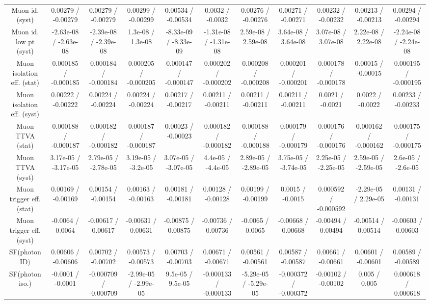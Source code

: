 \begin{table}[htbp]
\begin{center}
\begin{tabular}{|c|c|c|c|c|c|c|c|c|c|c|}
  Muon id. (syst) & 0.00279 / -0.00279 & 0.00279 / -0.00279 & 0.00299 / -0.00299 & 0.00534 / -0.00534 & 0.0032 / -0.0032 & 0.00276 / -0.00276 & 0.00271 / -0.00271 & 0.00232 / -0.00232 & 0.00213 / -0.00213 & 0.00294 / -0.00294 \\ 
  Muon id. low pt (syst) & -2.63e-08 / -2.63e-08 & -2.39e-08 / -2.39e-08 & 1.3e-08 / 1.3e-08 & -8.33e-09 / -8.33e-09 & -1.31e-08 / -1.31e-08 & 2.59e-08 / 2.59e-08 & 3.64e-08 / 3.64e-08 & 3.07e-08 / 3.07e-08 & 2.22e-08 / 2.22e-08 & -2.24e-08 / -2.24e-08 \\ 
  Muon isolation eff. (stat) & 0.000185 / -0.000185 & 0.000184 / -0.000184 & 0.000205 / -0.000205 & 0.000147 / -0.000147 & 0.000202 / -0.000202 & 0.000208 / -0.000208 & 0.000201 / -0.000201 & 0.000178 / -0.000178 & 0.00015 / -0.00015 & 0.000195 / -0.000195 \\ 
  Muon isolation eff. (syst) & 0.00222 / -0.00222 & 0.00224 / -0.00224 & 0.00224 / -0.00224 & 0.00217 / -0.00217 & 0.00211 / -0.00211 & 0.00211 / -0.00211 & 0.00211 / -0.00211 & 0.0021 / -0.0021 & 0.0022 / -0.0022 & 0.00233 / -0.00233 \\ 
  Muon TTVA (stat) & 0.000188 / -0.000187 & 0.000182 / -0.000182 & 0.000187 / -0.000187 & 0.00023 / -0.00023 & 0.000182 / -0.000182 & 0.000188 / -0.000188 & 0.000179 / -0.000179 & 0.000176 / -0.000176 & 0.000162 / -0.000162 & 0.000175 / -0.000175 \\ 
  Muon TTVA (syst) & 3.17e-05 / -3.17e-05 & 2.79e-05 / -2.78e-05 & 3.19e-05 / -3.2e-05 & 3.07e-05 / -3.07e-05 & 4.4e-05 / -4.4e-05 & 2.89e-05 / -2.89e-05 & 3.75e-05 / -3.74e-05 & 2.25e-05 / -2.25e-05 & 2.59e-05 / -2.59e-05 & 2.6e-05 / -2.6e-05 \\ 
  Muon trigger eff. (stat) & 0.00169 / -0.00169 & 0.00154 / -0.00154 & 0.00163 / -0.00163 & 0.00181 / -0.00181 & 0.00128 / -0.00128 & 0.00199 / -0.00199 & 0.0015 / -0.0015 & 0.000592 / -0.000592 & -2.29e-05 / 2.29e-05 & 0.00131 / -0.00131 \\ 
  Muon trigger eff. (syst) & -0.0064 / 0.0064 & -0.00617 / 0.00617 & -0.00631 / 0.00631 & -0.00875 / 0.00875 & -0.00736 / 0.00736 & -0.0065 / 0.0065 & -0.00668 / 0.00668 & -0.00494 / 0.00494 & -0.00514 / 0.00514 & -0.00603 / 0.00603 \\ 
  SF(photon ID) & 0.00606 / -0.00606 & 0.00702 / -0.00702 & 0.00573 / -0.00573 & 0.00703 / -0.00703 & 0.00671 / -0.00671 & 0.00561 / -0.00561 & 0.00587 / -0.00587 & 0.00661 / -0.00661 & 0.00601 / -0.00601 & 0.00589 / -0.00589 \\ 
  SF(photon iso.) & -0.0001 / -0.0001 & -0.000709 / -0.000709 & -2.99e-05 / -2.99e-05 & 9.5e-05 / 9.5e-05 & -0.000133 / -0.000133 & -5.29e-05 / -5.29e-05 & -0.000372 / -0.000372 & -0.00102 / -0.00102 & 0.005 / 0.005 & 0.000618 / 0.000618 \\ 

\end{tabular}
\end{center}
\end{table}
